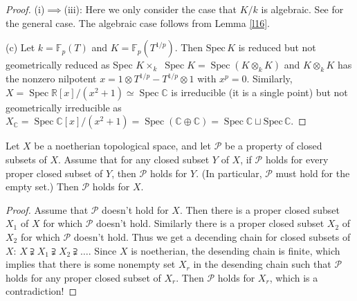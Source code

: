 \begin{proof}
	(i)$\implies$(iii): Here we only consider the case that $K/k$ is algebraic. See \cite[\href{https://stacks.math.columbia.edu/tag/035U}{Tag 035U}, Lemma 33.6.4]{stacks-project} for the general case. The algebraic case follows from Lemma \ref{l16}.
	
	(c) Let $k=\mathbb{F}_{p}(T)$ and $K=\mathbb{F}_{p}\left(T^{1 / p}\right)$. Then $\mathrm{Spec}\,K$ is reduced but not geometrically reduced as Spec $K \times_{k}$ $\operatorname{Spec} K=\operatorname{Spec}\left(K \otimes_{k} K\right)$ and $K \otimes_{k} K$ has the nonzero nilpotent $x=1 \otimes T^{1 / p}-T^{1 / p} \otimes 1$ with $x^{p}=0$. Similarly, $X=\operatorname{Spec} \mathbb{R}[x] /\left(x^{2}+1\right) \simeq \operatorname{Spec} \mathbb{C}$ is irreducible (it is a single point) but not geometrically irreducible as $X_{\mathbb{C}}=\operatorname{Spec} \mathbb{C}[x] /\left(x^{2}+1\right)=\operatorname{Spec}(\mathbb{C} \oplus \mathbb{C})=\operatorname{Spec} \mathbb{C}\sqcup\mathrm{Spec}\,\mathbb{C}$.
\end{proof}
\begin{exe}
	\label{2.3.16}
	Let $X$ be a noetherian topological space, and let $\mathscr{P}$ be a property of closed subsets of $X$. Assume that for any closed subset $Y$ of $X$, if $\mathscr{P}$ holds for every proper closed subset of $Y$, then $\mathscr{P}$ holds for $Y$. (In particular, $\mathscr{P}$ must hold for the empty set.) Then $\mathscr{P}$ holds for $X$.
\end{exe}
\begin{proof}
	Assume that $\mathscr{P}$ doesn't hold for $X$. Then there is a proper closed subset $X_1$ of $X$ for which $\mathscr{P}$ doesn't hold. Similarly there is a proper closed subset $X_2$ of $X_2$ for which $\mathscr{P}$ doesn't hold. Thus we get a decending chain for closed subsets of $X$: $X\supsetneqq X_1\supsetneqq X_2\supsetneqq\dots$. Since $X$ is noetherian, the desending chain is finite, which implies that there is some nonempty set $X_r$ in the desending chain such that $\mathscr{P}$ holds for any proper closed subset of $X_r$. Then $\mathscr{P}$ holds for $X_r$, which is a contradiction!
\end{proof}
